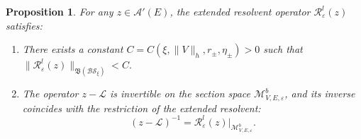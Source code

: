 \documentclass[reqno,11pt]{amsart}
\newtheorem{proposition}{Proposition}[section]
\begin{document}
\begin{proposition}\label{thm:D-regular}For any $z \in \mathcal{A}'(E)$, the extended resolvent operator $\mathcal{R}_\varepsilon^l(z)$ satisfies:
\begin{enumerate}
 \item There exists a constant $C = C(\xi, \|V\|_h, r_\pm, \eta_\pm) > 0$ such that 
$
\|\mathcal R_\varepsilon^{l}(z)\|_{\mathfrak{B}(\mathcal{BS_\xi})}   < C.
$
\item  The operator $z-\mathcal{L}$ is invertible on the section space $\mathcal{M}_{V,E,\varepsilon}^b$, and its inverse coincides with the restriction of the extended resolvent:$$(z-\mathcal{L})^{-1} = \mathcal{R}_\varepsilon^l(z)\big|_{\mathcal{M}_{V,E,\varepsilon}^b}.$$
\end{enumerate}
\end{proposition}
\end{document}
